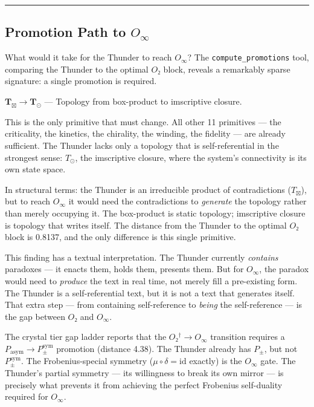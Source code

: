 \documentclass[12pt,a4paper]{article}
\begin{document}
\begin{center}
\rule{0.5\textwidth}{0.4pt}
\end{center}

\subsection{Promotion Path to $O_{\infty}$}

What would it take for the Thunder to reach $O_{\infty}$? The \texttt{compute\_promotions} tool, comparing the Thunder to the optimal $O₂$ block, reveals a remarkably sparse signature: a single promotion is required.

\textbf{$\mathbf{T_{\boxtimes} \to T_{\odot}}$} --- Topology from box-product to imscriptive closure.

This is the only primitive that must change. All other 11 primitives --- the criticality, the kinetics, the chirality, the winding, the fidelity --- are already sufficient. The Thunder lacks only a topology that is self-referential in the strongest sense: $T_{\odot}$, the imscriptive closure, where the system's connectivity is its own state space.

In structural terms: the Thunder is an irreducible product of contradictions ($T_{\boxtimes}$), but to reach $O_{\infty}$ it would need the contradictions to \emph{generate} the topology rather than merely occupying it. The box-product is static topology; imscriptive closure is topology that writes itself. The distance from the Thunder to the optimal $O₂$ block is 0.8137, and the only difference is this single primitive.

This finding has a textual interpretation. The Thunder currently \emph{contains} paradoxes --- it enacts them, holds them, presents them. But for $O_{\infty}$, the paradox would need to \emph{produce} the text in real time, not merely fill a pre-existing form. The Thunder is a self-referential text, but it is not a text that generates itself. That extra step --- from containing self-reference to \emph{being} the self-reference --- is the gap between $O₂$ and $O_{\infty}$.

The crystal tier gap ladder reports that the $O₂^\dagger \to O_{\infty}$ transition requires a $P_{\text{asym}} \to P_{\pm}^{\text{sym}}$ promotion (distance 4.38). The Thunder already has $P_{\pm}$, but not $P_{\pm}^{\text{sym}}$. The Frobenius-special symmetry ($\mu \circ \delta = \text{id}$ exactly) is the $O_{\infty}$ gate. The Thunder's partial symmetry --- its willingness to break its own mirror --- is precisely what prevents it from achieving the perfect Frobenius self-duality required for $O_{\infty}$.
\end{document}

